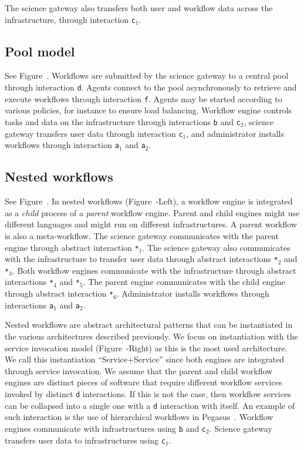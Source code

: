 \documentclass[preprint,3p,twocolumn]{elsarticle}
\newcommand{\correction}[1]{\color{blue}#1\color{black}\xspace}
\begin{document}
The science gateway also transfers both user and workflow data across
the infrastructure, through interaction \texttt{c$_1$}.
\subsection{Pool model}
\label{sec:pool}
See Figure~. Workflows are submitted by the
science gateway to a central pool through interaction
\texttt{d}. Agents connect to the pool asynchronously to retrieve and
execute workflows through interaction \texttt{f}. Agents may be
started according to various policies, for instance to ensure load
balancing. Workflow engine controls tasks and data on the
infrastructure through interactions \texttt{b} and \texttt{c$_2$},
science gateway transfers user data through interaction
\texttt{c$_1$}, and administrator installs workflows through
interaction \texttt{a$_1$} and \texttt{a$_2$}.

\subsection{Nested workflows}

See Figure~. In nested workflows
(Figure~-Left), a workflow engine is integrated
as a \emph{child} process of a \emph{parent} workflow engine. Parent
and child engines might use different languages and might run on
different infrastructures. A parent workflow is also a
meta-workflow. The science gateway communicates with the parent engine
through abstract interaction \texttt{*$_1$}. The science gateway also
communicates with the infrastructure to transfer user data through
abstract interactions \texttt{*$_2$} and \texttt{*$_3$}. Both workflow
engines communicate with the infrastructure through abstract
interactions \texttt{*$_4$} and \texttt{*$_5$}. The parent engine
communicates with the child engine through abstract interaction
\texttt{*$_6$}. Administrator installs workflows through interactions
\texttt{a$_1$} and \texttt{a$_2$}.

Nested workflows are abstract architectural patterns that can be
instantiated in the various architectures described previously. We
focus on instantiation with the service invocation model
(Figure~-Right) as this is the most used
architecture. \correction{We call this instantiation
  ``Service+Service'' since both engines are integrated through
  service invocation.} We assume that the parent
and child workflow engines are distinct pieces of software that
require different workflow services invoked by distinct \texttt{d}
interactions. If this is not the case, then workflow services can be
collapsed into a single one with a \texttt{d} interaction with
itself. An example of such interaction is the use of hierarchical
workflows in Pegasus~\cite{Deelman201517}.  Workflow engines
communicate with infrastructures using \texttt{b} and
\texttt{c$_2$}. Science gateway transfers user data to infrastructures
using \texttt{c$_1$}.
\end{document}
